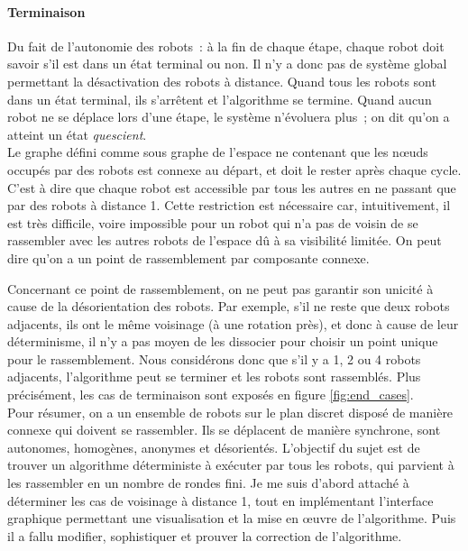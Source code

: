 \paragraph{Terminaison} Du fait de l'autonomie des robots~: à la fin de chaque
étape, chaque robot doit savoir s'il est dans un état terminal ou non. Il n'y a
donc pas de système global permettant la désactivation des robots à distance.
Quand tous les robots sont dans un état terminal, ils s'arrêtent et
l'algorithme se termine. Quand aucun robot ne se déplace lors d'une étape, le
système n'évoluera plus~; on dit qu'on a atteint un état \textit{quescient}. \\

Le graphe défini comme sous graphe de l'espace ne contenant que les n\oe{}uds
occupés par des robots est connexe au départ, et doit le rester après chaque
cycle. C'est à dire que chaque robot est accessible par tous les autres en ne
passant que par des robots à distance 1. Cette restriction est nécessaire car,
intuitivement, il est très difficile, voire impossible pour un robot qui n'a
pas de voisin de se rassembler avec les autres robots de l'espace dû à sa
visibilité limitée. On peut dire qu'on a un point de rassemblement par
composante connexe.

Concernant ce point de rassemblement, on ne peut pas garantir son unicité à
cause de la désorientation des robots. Par exemple, s'il ne reste que deux
robots adjacents, ils ont le même voisinage (à une rotation près), et donc à
cause de leur déterminisme, il n'y a pas moyen de les dissocier pour choisir un
point unique pour le rassemblement. Nous considérons donc que s'il y a 1, 2 ou
4 robots adjacents, l'algorithme peut se terminer et les robots sont
rassemblés. Plus précisément, les cas de terminaison sont exposés en figure
\ref{fig:end_cases}. \\ 

Pour résumer, on a un ensemble de robots sur le plan discret disposé de manière
connexe qui doivent se rassembler. Ils se déplacent de manière synchrone, sont
autonomes, homogènes, anonymes et désorientés. L'objectif du sujet est de
trouver un algorithme déterministe à exécuter par tous les robots, qui parvient
à les rassembler en un nombre de rondes fini. Je me suis d'abord attaché à
déterminer les cas de voisinage à distance 1, tout en implémentant l'interface
graphique permettant une visualisation et la mise en \oe{}uvre de l'algorithme.
Puis il a fallu modifier, sophistiquer et prouver la correction de
l'algorithme.


